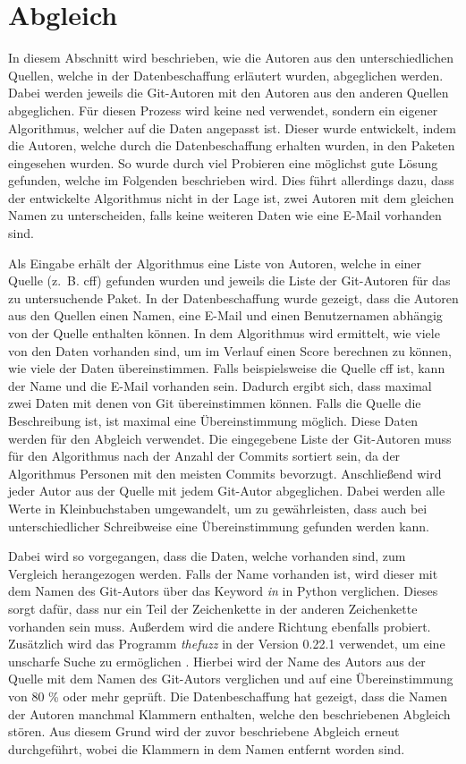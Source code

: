 \section{Abgleich}
\label{sec:abgleich}
In diesem Abschnitt wird beschrieben, wie die Autoren aus den unterschiedlichen Quellen, welche in der Datenbeschaffung erläutert wurden, abgeglichen werden.
Dabei werden jeweils die Git-Autoren mit den Autoren aus den anderen Quellen abgeglichen.
Für diesen Prozess wird keine \gls{ned} verwendet, sondern ein eigener Algorithmus, welcher auf die Daten angepasst ist.
Dieser wurde entwickelt, indem die Autoren, welche durch die Datenbeschaffung erhalten wurden, in den Paketen eingesehen wurden.
So wurde durch viel Probieren eine möglichst gute Lösung gefunden, welche im Folgenden beschrieben wird.
Dies führt allerdings dazu, dass der entwickelte Algorithmus nicht in der Lage ist, zwei Autoren mit dem gleichen Namen zu unterscheiden, falls keine weiteren Daten wie eine E-Mail vorhanden sind.

Als Eingabe erhält der Algorithmus eine Liste von Autoren, welche in einer Quelle (z. B. \gls{cff}) gefunden wurden und jeweils die Liste der Git-Autoren für das zu untersuchende Paket.
In der Datenbeschaffung wurde gezeigt, dass die Autoren aus den Quellen einen Namen, eine E-Mail und einen Benutzernamen abhängig von der Quelle enthalten können.
In dem Algorithmus wird ermittelt, wie viele von den Daten vorhanden sind, um im Verlauf einen Score berechnen zu können, wie viele der Daten übereinstimmen.
Falls beispielsweise die Quelle \gls{cff} ist, kann der Name und die E-Mail vorhanden sein.
Dadurch ergibt sich, dass maximal zwei Daten mit denen von Git übereinstimmen können.
Falls die Quelle die Beschreibung ist, ist maximal eine Übereinstimmung möglich.
Diese Daten werden für den Abgleich verwendet.
Die eingegebene Liste der Git-Autoren muss für den Algorithmus nach der Anzahl der Commits sortiert sein, da der Algorithmus Personen mit den meisten Commits bevorzugt.
Anschließend wird jeder Autor aus der Quelle mit jedem Git-Autor abgeglichen.
Dabei werden alle Werte in Kleinbuchstaben umgewandelt, um zu gewährleisten, dass auch bei unterschiedlicher Schreibweise eine Übereinstimmung gefunden werden kann.

Dabei wird so vorgegangen, dass die Daten, welche vorhanden sind, zum Vergleich herangezogen werden.
Falls der Name vorhanden ist, wird dieser mit dem Namen des Git-Autors über das Keyword \emph{in} in Python verglichen.
Dieses sorgt dafür, dass nur ein Teil der Zeichenkette in der anderen Zeichenkette vorhanden sein muss.
Außerdem wird die andere Richtung ebenfalls probiert.
Zusätzlich wird das Programm \emph{thefuzz} in der Version 0.22.1 verwendet, um eine unscharfe Suche zu ermöglichen \autocite{bachmann_thefuzz_2023}.
Hierbei wird der Name des Autors aus der Quelle mit dem Namen des Git-Autors verglichen und auf eine Übereinstimmung von 80 \% oder mehr geprüft.
Die Datenbeschaffung hat gezeigt, dass die Namen der Autoren manchmal Klammern enthalten, welche den beschriebenen Abgleich stören.
Aus diesem Grund wird der zuvor beschriebene Abgleich erneut durchgeführt, wobei die Klammern in dem Namen entfernt worden sind.

